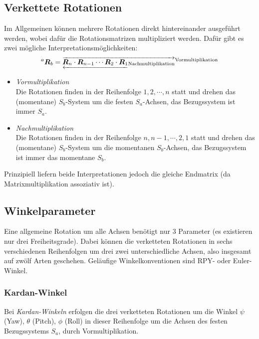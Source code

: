 		\subsection{Verkettete Rotationen}
			Im Allgemeinen können mehrere Rotationen direkt hintereinander ausgeführt werden, wobei dafür die Rotationsmatrizen multipliziert werden. Dafür gibt es zwei mögliche Interpretationsmöglichkeiten:
			\begin{equation*}
				\prescript{a}{}{\bm{R}}_b = \overrightarrow{\underleftarrow{\bm{R}_n \cdot \bm{R}_{n - 1} \cdots \bm{R}_2 \cdot \bm{R}_1}_\text{Nachmultiplikation}}^\text{Vormultiplikation}
			\end{equation*}
			\begin{itemize}
				\item \emph{Vormultiplikation} \\ Die Rotationen finden in der Reihenfolge \( 1, 2, \cdots, n \) statt und drehen das (momentane) \(S_b\)-System um die festen \(S_a\)-Achsen, das Bezugssystem ist immer \(S_a\).
				\item \emph{Nachmultiplikation} \\ Die Rotationen finden in der Reihenfolge \( n, n - 1, \cdots, 2, 1 \) statt und drehen das (momentane) \(S_b\)-System um die momentanen \(S_b\)-Achsen, das Bezugssystem ist immer das momentane \(S_b\).
			\end{itemize}
			Prinzipiell liefern beide Interpretationen jedoch die gleiche Endmatrix (da Matrixmultiplikation assoziativ ist).

		\subsection{Winkelparameter}
			Eine allgemeine Rotation um alle Achsen benötigt nur \(3\) Parameter (es existieren nur drei Freiheitsgrade). Dabei können die verketteten Rotationen in sechs verschiedenen Reihenfolgen um drei \bzw zwei unterschiedliche Achsen, also insgesamt auf zwölf Arten geschehen. Geläufige Winkelkonventionen sind \zB RPY- oder Euler-Winkel.

			\subsubsection{Kardan-Winkel}
				Bei \emph{Kardan-Winkeln} erfolgen die drei verketteten Rotationen um die Winkel \(\psi\) (Yaw), \(\theta\) (Pitch), \(\phi\) (Roll) in dieser Reihenfolge um die Achsen des festen Bezugssystems \(S_a\), \dh durch Vormultiplikation.

